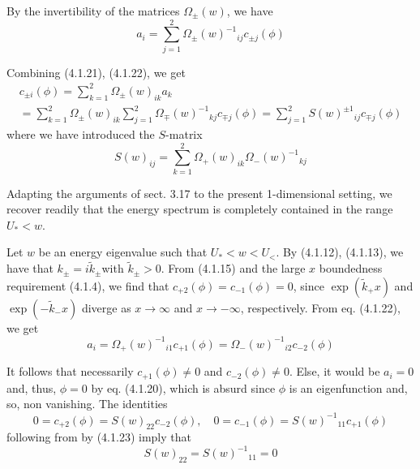 \documentclass{article}
\begin{document}
By the invertibility of the matrices $\Omega_{ \pm}(w)$, we have
$$
\begin{equation*}
a_{i}=\sum_{j=1}^{2} \Omega_{ \pm}(w)^{-1}{ }_{i j} c_{ \pm j}(\phi) \tag{4.1.22}
\end{equation*}
$$

Combining (4.1.21), (4.1.22), we get
$$
\begin{gather*}
c_{ \pm i}(\phi)=\sum_{k=1}^{2} \Omega_{ \pm}(w)_{i k} a_{k}  \tag{4.1.23}\\
=\sum_{k=1}^{2} \Omega_{ \pm}(w)_{i k} \sum_{j=1}^{2} \Omega_{\mp}(w)^{-1}{ }_{k j} c_{\mp j}(\phi)=\sum_{j=1}^{2} S(w)^{ \pm 1}{ }_{i j} c_{\mp j}(\phi)
\end{gather*}
$$
where we have introduced the $S$-matrix
$$
\begin{equation*}
S(w)_{i j}=\sum_{k=1}^{2} \Omega_{+}(w)_{i k} \Omega_{-}(w)^{-1}{ }_{k j} \tag{4.1.24}
\end{equation*}
$$

Adapting the arguments of sect. 3.17 to the present 1-dimensional setting, we recover readily that the energy spectrum is completely contained in the range $U_{*}<w$.

Let $w$ be an energy eigenvalue such that $U_{*}<w<U_{<}$. By (4.1.12), (4.1.13), we have that $k_{ \pm}=i \tilde{k}_{ \pm}$with $\tilde{k}_{ \pm}>0$. From (4.1.15) and the large $x$ boundedness requirement (4.1.4), we find that $c_{+2}(\phi)=c_{-1}(\phi)=0$, since $\exp \left(\tilde{k}_{+} x\right)$ and $\exp \left(-\tilde{k}_{-} x\right)$ diverge as $x \rightarrow \infty$ and $x \rightarrow-\infty$, respectively. From eq. (4.1.22), we get
$$
\begin{equation*}
a_{i}=\Omega_{+}(w)^{-1}{ }_{i 1} c_{+1}(\phi)=\Omega_{-}(w)^{-1}{ }_{i 2} c_{-2}(\phi) \tag{4.1.25}
\end{equation*}
$$

It follows that necessarily $c_{+1}(\phi) \neq 0$ and $c_{-2}(\phi) \neq 0$. Else, it would be $a_{i}=0$ and, thus, $\phi=0$ by eq. (4.1.20), which is absurd since $\phi$ is an eigenfunction and, so, non vanishing. The identities
$$
\begin{equation*}
0=c_{+2}(\phi)=S(w)_{22} c_{-2}(\phi), \quad 0=c_{-1}(\phi)=S(w)^{-1}{ }_{11} c_{+1}(\phi) \tag{4.1.26}
\end{equation*}
$$
following from by (4.1.23) imply that
$$
\begin{equation*}
S(w)_{22}=S(w)^{-1}{ }_{11}=0 \tag{4.1.27}
\end{equation*}
$$
\end{document}
